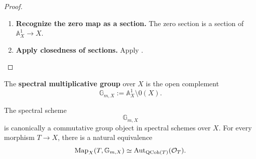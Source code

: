 \begin{proof}
\leavevmode
\begin{enumerate}[label=\textup{(\arabic*)}]
    \item \textbf{Recognize the zero map as a section.}
    The zero section is a section of \(\mathbb A_X^1\to X\).

    \item \textbf{Apply closedness of sections.}
    Apply
    .
\end{enumerate}
\end{proof}

\begin{definition}
\label{def:spectral-multiplicative-group}
The \textbf{spectral multiplicative group} over $X$ is the open complement
\[
    \mathbb G_{m,X}
    :=
    \mathbb A_X^1
    \setminus
    0(X).
\]
\end{definition}

\begin{proposition}
\label{prop:spectral-multiplicative-group-structure}
The spectral scheme
\[
    \mathbb G_{m,X}
\]
is canonically a commutative group object in spectral schemes over \(X\).
For every morphism \(T\to X\), there is a natural equivalence
\[
    \operatorname{Map}_X(T,\mathbb G_{m,X})
    \simeq
    \operatorname{Aut}_{\operatorname{QCoh}(T)}(\mathcal O_T).
\]
\end{proposition}

